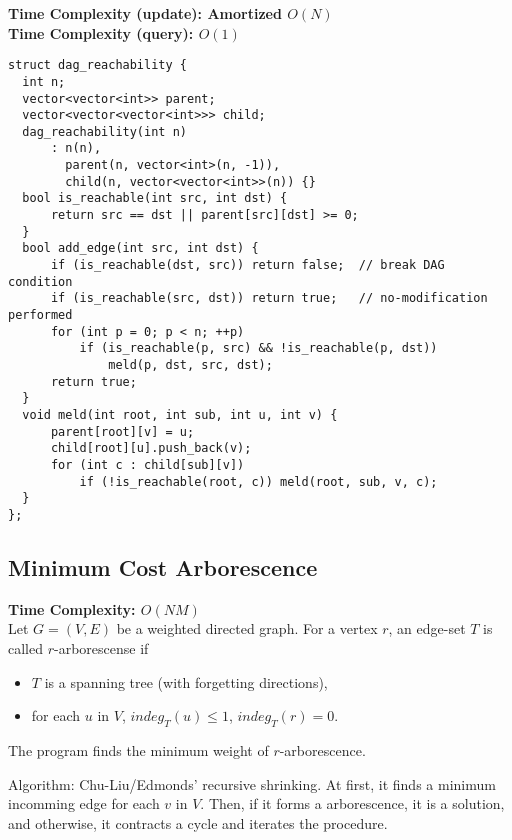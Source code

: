 \textbf{Time Complexity (update): Amortized $O(N)$}\\
\textbf{Time Complexity (query): $O(1)$}\\

\begin{lstlisting}
struct dag_reachability {
  int n;
  vector<vector<int>> parent;
  vector<vector<vector<int>>> child;
  dag_reachability(int n)
      : n(n),
        parent(n, vector<int>(n, -1)),
        child(n, vector<vector<int>>(n)) {}
  bool is_reachable(int src, int dst) {
      return src == dst || parent[src][dst] >= 0;
  }
  bool add_edge(int src, int dst) {
      if (is_reachable(dst, src)) return false;  // break DAG condition
      if (is_reachable(src, dst)) return true;   // no-modification performed
      for (int p = 0; p < n; ++p)
          if (is_reachable(p, src) && !is_reachable(p, dst))
              meld(p, dst, src, dst);
      return true;
  }
  void meld(int root, int sub, int u, int v) {
      parent[root][v] = u;
      child[root][u].push_back(v);
      for (int c : child[sub][v])
          if (!is_reachable(root, c)) meld(root, sub, v, c);
  }
};
\end{lstlisting}

\newpage

\subsection{Minimum Cost Arborescence}

\textbf{Time Complexity: $O(NM)$}\\

Let $G = (V, E)$ be a weighted directed graph.
For a vertex $r$, an edge-set $T$ is called $r$-arborescense if
\begin{itemize}
  \item $T$ is a spanning tree (with forgetting directions),
  \item for each $u$ in $V$, $indeg_T(u) \leq 1$, $indeg_T(r) = 0$.
\end{itemize}
The program finds the minimum weight of $r$-arborescence.

Algorithm:
Chu-Liu/Edmonds' recursive shrinking.
At first, it finds a minimum incomming edge for each $v$ in $V$.
Then, if it forms a arborescence, it is a solution,
and otherwise, it contracts a cycle and iterates the procedure.

